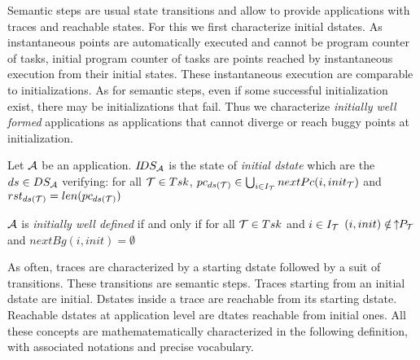 \documentclass{article}
\begin{document}
Semantic steps are usual state transitions and allow to provide applications with traces and reachable states. For this we first characterize initial dstates. As instantaneous points are automatically executed and cannot be program counter of tasks, initial program counter of tasks are points reached by instanta\-neous execution from their initial states. These instantaneous execution are comparable to initializations. As for semantic steps, even if some successful initialization exist, there may be initializations that fail. Thus we characterize {\em initially well formed} applications as applications that cannot diverge or reach buggy points at initialization. 
\begin{definition}\label{def-idst} Let ${\cal A}$ be an application. $I\!DS_{\cal A}$ is the state of {\em initial dstate} which are the $ds\in DS_{\cal A}$ verifying:
 for all ${\cal T}\in Tsk$, $pc_{ds({\cal T})}\in \bigcup_{i\in I_{\cal T}}nextPc(i,init_{\cal T})$ and $rst_{ds({\cal T})}=len(pc_{ds({\cal T})})$

\vspace{1mm}
${\cal A}$ is {\em initially well defined} if and only if
for all ${\cal T}\in Tsk$ and $i\in I_{\cal T}$ $(i,init)\notin \,\uparrow\!\!P_{\cal T}$ and $nextBg(i,init)=\emptyset$
\end{definition}
As often, traces are characterized by a starting dstate followed by a suit of transitions. These transitions are semantic steps. Traces starting from an initial dstate are initial. Dstates inside a trace are reachable from its starting dstate. Reachable dstates at application level are dtates reachable from initial ones. All these concepts are mathematematically characterized in the following definition, with associated notations and precise vocabulary.
\end{document}

